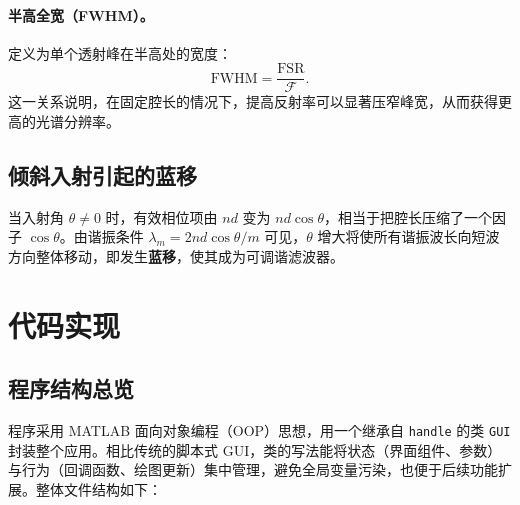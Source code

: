 \documentclass[10.5pt]{config}
\begin{document}
\paragraph{半高全宽（FWHM）。} 定义为单个透射峰在半高处的宽度：
$$\mathrm{FWHM} = \frac{\mathrm{FSR}}{\mathcal{F}}.$$
这一关系说明，在固定腔长的情况下，提高反射率可以显著压窄峰宽，从而获得更高的光谱分辨率。

\subsection{倾斜入射引起的蓝移}

当入射角 $\theta \neq 0$ 时，有效相位项由 $nd$ 变为 $nd\cos\theta$，相当于把腔长压缩了一个因子 $\cos\theta$。由谐振条件 $\lambda_m = 2nd\cos\theta/m$ 可见，$\theta$ 增大将使所有谐振波长向短波方向整体移动，即发生\textbf{蓝移}，使其成为可调谐滤波器。

\section{代码实现}

\subsection{程序结构总览}

程序采用 MATLAB 面向对象编程（OOP）思想，用一个继承自 \texttt{handle} 的类 \texttt{GUI} 封装整个应用。相比传统的脚本式 GUI，类的写法能将状态（界面组件、参数）与行为（回调函数、绘图更新）集中管理，避免全局变量污染，也便于后续功能扩展。整体文件结构如下：
\end{document}

